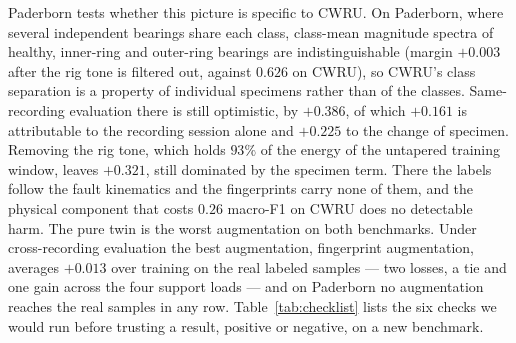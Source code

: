 \documentclass[journal]{IEEEtran}
\begin{document}
Paderborn tests whether this picture is specific to CWRU. On
Paderborn, where several independent bearings share each class, class-mean
magnitude spectra of healthy, inner-ring and outer-ring bearings are
indistinguishable (margin $+0.003$ after the rig tone is filtered out, against
$0.626$ on CWRU), so CWRU's class separation is a property of individual
specimens rather than of the classes. Same-recording evaluation there is still
optimistic, by $+0.386$, of which $+0.161$ is attributable to the recording
session alone and $+0.225$ to the change of specimen. Removing the rig tone,
which holds $93\%$ of the energy of the untapered training window, leaves $+0.321$, still dominated by
the specimen term. There the
labels follow the fault kinematics and the fingerprints carry none of them, and
the physical component that costs $0.26$ macro-F1 on CWRU does no detectable
harm. The pure twin is the worst augmentation on both benchmarks. Under
cross-recording evaluation the best augmentation, fingerprint augmentation,
averages $+0.013$ over training on the real labeled samples --- two losses, a
tie and one gain across the four support loads --- and on Paderborn no
augmentation reaches the real samples in any row. Table~\ref{tab:checklist}
lists the six checks we would run before trusting a result, positive or
negative, on a new benchmark.



\end{document}
